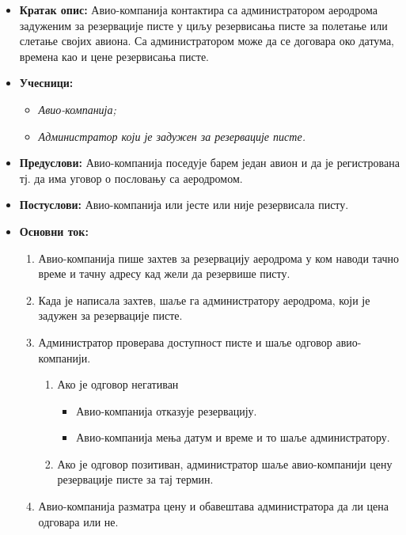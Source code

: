 \documentclass{article}
\begin{document}
\begin{itemize}
    \item \textbf{Кратак опис:} Авио-компанија контактира са администратором аеродрома задуженим за резервације писте у циљу резервисања писте за полетање или слетање својих авиона. Са администратором може да се договара око датума, времена као и цене резервисања писте.
    \item \textbf{Учесници:}
        \begin{itemize}
            \item \textit{Авио-компанија;}
            \item \textit{Администратор који је задужен за резервације писте.}
        \end{itemize}
    \item \textbf{Предуслови:} Авио-компанија поседује барем један авион и да је регистрована тј. да има уговор о пословању са аеродромом.
    \item \textbf{Постуслови:} Авио-компанија или јесте или није резервисала писту.
    \newpage
    \item \textbf{Основни ток:}
        \begin{enumerate}
            \item Авио-компанија пише захтев за резервацију аеродрома у ком наводи тачно време и тачну адресу кад жели да резервише писту.
            \item Када је написала захтев, шаље га администратору аеродрома, који је задужен за резервације писте.
            \item Администратор проверава доступност писте и шаље одговор авио-компанији.
                \begin{enumerate}
                    \item Ако је одговор негативан
                        \begin{itemize}
                            \item Авио-компанија отказује резервацију.
                            \item Авио-компанија мења датум и време и то шаље администратору.
                        \end{itemize}
                    \item Ако је одговор позитиван, администратор шаље авио-компанији цену резервације писте за тај термин.
                \end{enumerate}
            \item Авио-компанија разматра цену и обавештава администратора да ли цена одговара или не.

\end{enumerate}
\end{itemize}
\end{document}
